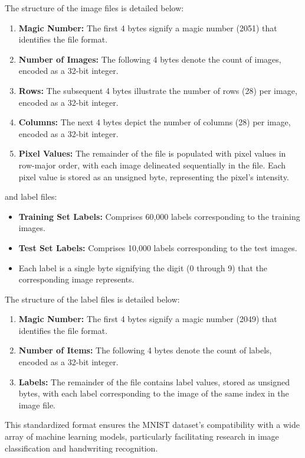 The structure of the image files is detailed below:
\begin{enumerate}
    \item \textbf{Magic Number:} The first 4 bytes signify a magic number (2051) that identifies the file format.
    \item \textbf{Number of Images:} The following 4 bytes denote the count of images, encoded as a 32-bit integer.
    \item \textbf{Rows:} The subsequent 4 bytes illustrate the number of rows (28) per image, encoded as a 32-bit integer.
    \item \textbf{Columns:} The next 4 bytes depict the number of columns (28) per image, encoded as a 32-bit integer.
    \item \textbf{Pixel Values:} The remainder of the file is populated with pixel values in row-major order, with each image delineated sequentially in the file. Each pixel value is stored as an unsigned byte, representing the pixel's intensity.
\end{enumerate}

and label files:
\begin{itemize}
    \item \textbf{Training Set Labels:} Comprises 60,000 labels corresponding to the training images.
    \item \textbf{Test Set Labels:} Comprises 10,000 labels corresponding to the test images.
    \item Each label is a single byte signifying the digit (0 through 9) that the corresponding image represents.
\end{itemize}

The structure of the label files is detailed below:
\begin{enumerate}
    \item \textbf{Magic Number:} The first 4 bytes signify a magic number (2049) that identifies the file format.
    \item \textbf{Number of Items:} The following 4 bytes denote the count of labels, encoded as a 32-bit integer.
    \item \textbf{Labels:} The remainder of the file contains label values, stored as unsigned bytes, with each label corresponding to the image of the same index in the image file.
\end{enumerate}

This standardized format ensures the MNIST dataset's compatibility with a wide array of machine learning models, particularly facilitating research in image classification and handwriting recognition.

